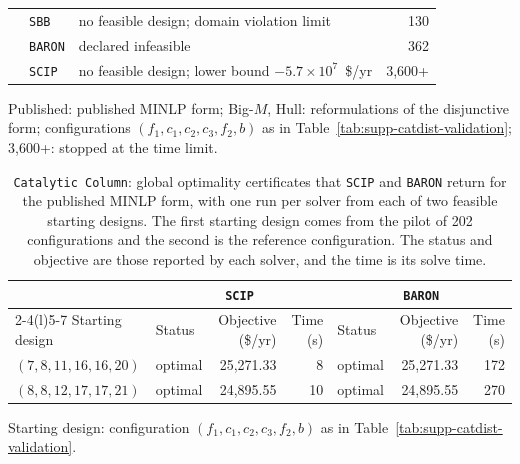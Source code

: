 \begin{table}[htbp]
\begin{threeparttable}
\begin{tabular}{@{}lllr@{}}
 & \texttt{SBB} & no feasible design; domain violation limit & 130 \\
 & \texttt{BARON} & declared infeasible & 362 \\
 & \texttt{SCIP} & no feasible design; lower bound \(-5.7\times10^{7}\)~\$/yr & 3{,}600+ \\
\bottomrule
\end{tabular}
\begin{tablenotes}[flushleft]\footnotesize
\item Published: published MINLP form; Big-\(M\), Hull: reformulations of the disjunctive form; configurations \((f_1,c_1,c_2,c_3,f_2,b)\) as in Table~\ref{tab:supp-catdist-validation}; 3,600+: stopped at the time limit.
\end{tablenotes}
\end{threeparttable}
\end{table}

\begin{table}[htbp]
\centering
\caption{\texttt{Catalytic Column}: global optimality certificates that \texttt{SCIP} and \texttt{BARON} return for the published MINLP form, with one run per solver from each of two feasible starting designs.
The first starting design comes from the pilot of 202 configurations and the second is the reference configuration.
The status and objective are those reported by each solver, and the time is its solve time.}
\label{tab:supp-catdist-certificates}
\footnotesize
\begin{threeparttable}
\begin{tabular}{@{}llrrlrr@{}}\toprule
 & \multicolumn{3}{c}{\texttt{SCIP}} & \multicolumn{3}{c}{\texttt{BARON}}\\\cmidrule(lr){2-4}\cmidrule(l){5-7}
Starting design & Status & Objective (\$/yr) & Time (s) & Status & Objective (\$/yr) & Time (s)\\\midrule
\((7,8,11,16,16,20)\) & optimal & 25,271.33 & 8 & optimal & 25,271.33 & 172\\
\((8,8,12,17,17,21)\) & optimal & 24,895.55 & 10 & optimal & 24,895.55 & 270\\
\bottomrule
\end{tabular}
\begin{tablenotes}[flushleft]\footnotesize
\item Starting design: configuration \((f_1,c_1,c_2,c_3,f_2,b)\) as in Table~\ref{tab:supp-catdist-validation}.
\end{tablenotes}
\end{threeparttable}
\end{table}
\FloatBarrier

